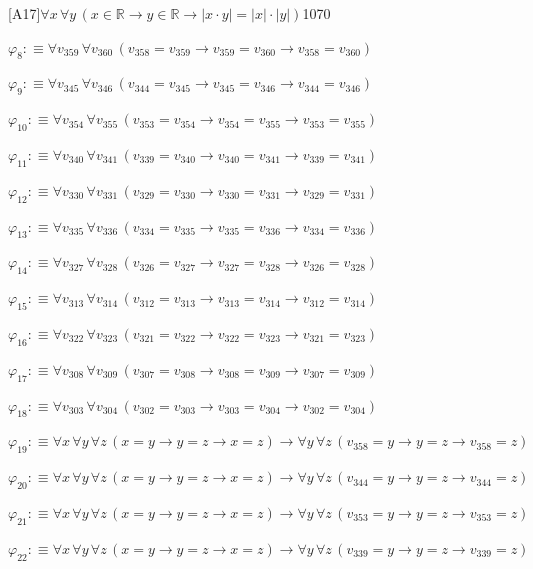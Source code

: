 \begin{fullproof}{[A17]}{$\forall x\,\forall y\,(x \in \mathbb{R} \to y \in \mathbb{R} \to \lvert x \cdot y \rvert = \lvert x \rvert \cdot \lvert y \rvert)$}{1070}
\begin{abbrevlist}
\item $\varphi_{8} :\equiv \forall v_{359}\,\forall v_{360}\,(v_{358} = v_{359} \to v_{359} = v_{360} \to v_{358} = v_{360})$
\item $\varphi_{9} :\equiv \forall v_{345}\,\forall v_{346}\,(v_{344} = v_{345} \to v_{345} = v_{346} \to v_{344} = v_{346})$
\item $\varphi_{10} :\equiv \forall v_{354}\,\forall v_{355}\,(v_{353} = v_{354} \to v_{354} = v_{355} \to v_{353} = v_{355})$
\item $\varphi_{11} :\equiv \forall v_{340}\,\forall v_{341}\,(v_{339} = v_{340} \to v_{340} = v_{341} \to v_{339} = v_{341})$
\item $\varphi_{12} :\equiv \forall v_{330}\,\forall v_{331}\,(v_{329} = v_{330} \to v_{330} = v_{331} \to v_{329} = v_{331})$
\item $\varphi_{13} :\equiv \forall v_{335}\,\forall v_{336}\,(v_{334} = v_{335} \to v_{335} = v_{336} \to v_{334} = v_{336})$
\item $\varphi_{14} :\equiv \forall v_{327}\,\forall v_{328}\,(v_{326} = v_{327} \to v_{327} = v_{328} \to v_{326} = v_{328})$
\item $\varphi_{15} :\equiv \forall v_{313}\,\forall v_{314}\,(v_{312} = v_{313} \to v_{313} = v_{314} \to v_{312} = v_{314})$
\item $\varphi_{16} :\equiv \forall v_{322}\,\forall v_{323}\,(v_{321} = v_{322} \to v_{322} = v_{323} \to v_{321} = v_{323})$
\item $\varphi_{17} :\equiv \forall v_{308}\,\forall v_{309}\,(v_{307} = v_{308} \to v_{308} = v_{309} \to v_{307} = v_{309})$
\item $\varphi_{18} :\equiv \forall v_{303}\,\forall v_{304}\,(v_{302} = v_{303} \to v_{303} = v_{304} \to v_{302} = v_{304})$
\item $\varphi_{19} :\equiv \forall x\,\forall y\,\forall z\,(x = y \to y = z \to x = z) \to \forall y\,\forall z\,(v_{358} = y \to y = z \to v_{358} = z)$
\item $\varphi_{20} :\equiv \forall x\,\forall y\,\forall z\,(x = y \to y = z \to x = z) \to \forall y\,\forall z\,(v_{344} = y \to y = z \to v_{344} = z)$
\item $\varphi_{21} :\equiv \forall x\,\forall y\,\forall z\,(x = y \to y = z \to x = z) \to \forall y\,\forall z\,(v_{353} = y \to y = z \to v_{353} = z)$
\item $\varphi_{22} :\equiv \forall x\,\forall y\,\forall z\,(x = y \to y = z \to x = z) \to \forall y\,\forall z\,(v_{339} = y \to y = z \to v_{339} = z)$

\end{abbrevlist}
\end{fullproof}
